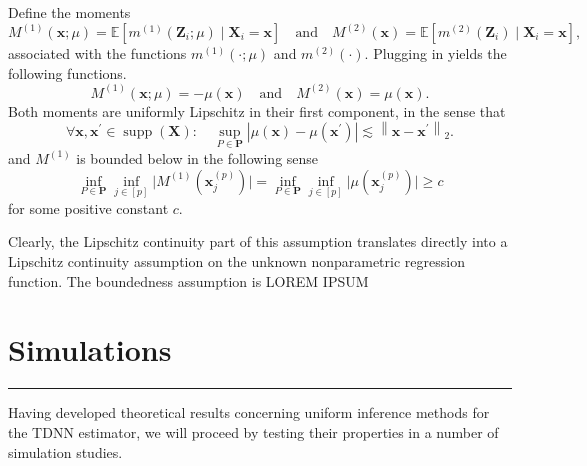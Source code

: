\documentclass[letterpaper,10pt]{article}
\numberwithin{equation}{section}
\numberwithin{theorem}{section}
\numberwithin{remark}{section}
\numberwithin{example}{section}
\theoremstyle{definition}
\newcommand{\1}{\mathbb{1}}
\begin{document}
\vspace{0.5cm}
\begin{assumption}
	Define the moments
	\begin{equation}
		M^{(1)}(\mathbf{x} ; \mu)
		= \mathbb{E}\left[m^{(1)}\left(\mathbf{Z}_i ; \mu\right) \mid \mathbf{X}_i= \mathbf{x}\right]
		\quad \text{and} \quad
		M^{(2)}(\mathbf{x})
		= \mathbb{E}\left[m^{(2)}\left(\mathbf{Z}_i\right) \mid \mathbf{X}_i = \mathbf{x}\right],
	\end{equation}
	associated with the functions $m^{(1)}(\cdot ; \mu)$ and $m^{(2)}(\cdot)$.
	Plugging in yields the following functions.
	\begin{equation}
		M^{(1)}(\mathbf{x} ; \mu)
		= -\mu(\mathbf{x})
		\quad \text{and} \quad
		M^{(2)}(\mathbf{x})
		= \mu(\mathbf{x}).
	\end{equation}
	Both moments are uniformly Lipschitz in their first component, in the sense that
	\begin{equation}
		\forall \mathbf{x}, \mathbf{x}^{\prime} \in \operatorname{supp}\left(\mathbf{X}\right): \quad
		\sup _{P \in \mathbf{P}}
		\left|\mu(\mathbf{x})-\mu\left(\mathbf{x}^{\prime}\right)\right|
		\lesssim\left\|\mathbf{x}-\mathbf{x}^{\prime}\right\|_{2}.
	\end{equation}
	and $M^{(1)}$ is bounded below in the following sense
	\begin{equation}
		\inf_{P \in \mathbf{P}} \inf_{j \in [p]} \Big|M^{(1)}\left(\mathbf{x}^{(p)}_{j}\right) \Big|
		= \inf_{P \in \mathbf{P}} \inf_{j \in [p]} \Big|\mu\left(\mathbf{x}^{(p)}_{j}\right) \Big| \geq c
	\end{equation}
	for some positive constant $c$.
\end{assumption}

Clearly, the Lipschitz continuity part of this assumption translates directly into a Lipschitz continuity assumption on the unknown nonparametric regression function.
The boundedness assumption is
	{\color{red} LOREM IPSUM}

\newpage
\section{Simulations}\label{Simulations}
\hrule

Having developed theoretical results concerning uniform inference methods for the TDNN estimator, we will proceed by testing their properties in a number of simulation studies.
\end{document}
